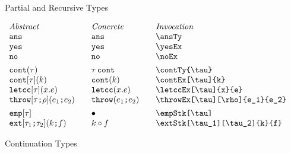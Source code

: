 \documentclass[11pt]{article}
\begin{document}
\begin{figure}
  \caption{Partial and Recursive Types}
  \label{fig:recursive}
\end{figure}

\begin{figure}

  \begin{small}
    \begin{displaymath}
      \begin{array}{l@{\qquad}l@{\qquad}l@{\qquad}l}
        \textit{Abstract} & \textit{Concrete} & \textit{Invocation} \\
        \ansTy                         & \ansTy*             & \verb|\ansTy|                         \\
        \yesEx                         & \yesEx*             & \verb|\yesEx|                         \\
        \noEx                          & \noEx*              & \verb|\noEx|                          \\[1ex]

        \contTy{\tau}                  & \contTy*{\tau}      & \verb|\contTy{\tau}|                  \\
        \contEx[\tau]{k}               & \contEx*{k}         & \verb|\contEx[\tau]{k} |                    \\
        \letccEx[\tau]{x}{e}           & \letccEx*{x}{e}     & \verb|\letccEx[\tau]{x}{e}|           \\
        \throwEx[\tau][\rho]{e_1}{e_2} & \throwEx*{e_1}{e_2} & \verb|\throwEx[\tau][\rho]{e_1}{e_2}| \\[1ex]

        \empStk[\tau]                  & \empStk*[\tau]      & \verb|\empStk[\tau]|                  \\
        \extStk[\tau_1][\tau_2]{k}{f}  & \extStk*{k}{f}      & \verb|\extStk[\tau_1][\tau_2]{k}{f}|
      \end{array}
    \end{displaymath}
  \end{small}

  \caption{Continuation Types}
  \label{fig:cont}
\end{figure}
\end{document}
